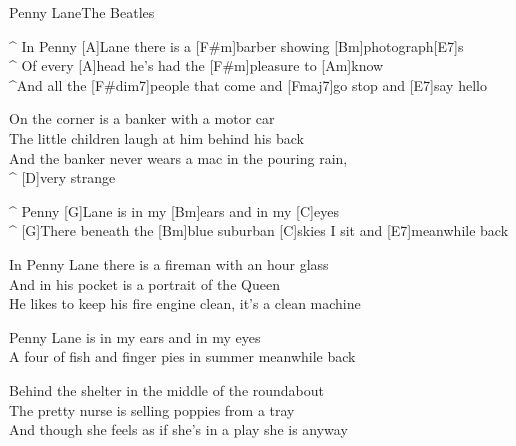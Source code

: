 \begin{song}{Penny Lane}{The Beatles}

\begin{guitar}
^ In Penny [A]Lane there is a [F#m]barber showing [Bm]photograph[E7]s\\
^ Of every [A]head he's had the [F#m]pleasure to [Am]know\\
^And all the [F#dim7]people that come and [Fmaj7]go stop and [E7]say hello\\
\end{guitar}

\begin{guitar}
On the corner is a banker with a motor car\\
The little children laugh at him behind his back\\
And the banker never wears a mac in the pouring rain, \\
^ [D]very strange\\
\end{guitar}

\begin{guitar}
^ Penny [G]Lane is in my [Bm]ears and in my [C]eyes\\
^ [G]There beneath the [Bm]blue suburban [C]skies I sit and [E7]meanwhile back\\
\end{guitar}


\begin{guitar}
In Penny Lane there is a fireman with an hour glass  \\
And in his pocket is a portrait of the Queen\\
He likes to keep his fire engine clean, it's a clean machine\\
\end{guitar}


\begin{guitar}
Penny Lane is in my ears and in my eyes\\
A four of fish and finger pies in summer meanwhile back\\
\end{guitar}


\begin{guitar}
Behind the shelter in the middle of the roundabout\\
The pretty nurse is selling poppies from a tray\\
And though she feels as if she's in a play   she is anyway\\
\end{guitar}


\end{song}
